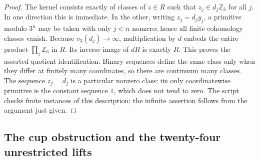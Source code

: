 \begin{proof}
The kernel consists exactly of classes of $z\in R$ such that
$z_j\in d_j\mathbb Z_3$ for all $j$. In one direction this is
immediate. In the other, writing $z_j=d_jy_j$, a primitive modulo
$3^n$ may be taken with only $j<n$ nonzero; hence all finite
cohomology classes vanish. Because $v_3(d_j)\to\infty$, multiplication
by $d$ embeds the entire product $\prod_j\mathbb Z_3$ in $R$.
Its inverse image of $dR$ is exactly $R$. This proves the asserted
quotient identification. Binary sequences define the same class only
when they differ at finitely many coordinates, so there are continuum
many classes. The sequence $z_j=d_j$ is a particular nonzero class:
its only coordinatewise primitive is the constant sequence $1$, which
does not tend to zero. The script 
checks finite instances of this description; the infinite assertion
follows from the argument just given.
\end{proof}

\subsection{The cup obstruction and the twenty-four unrestricted lifts}

